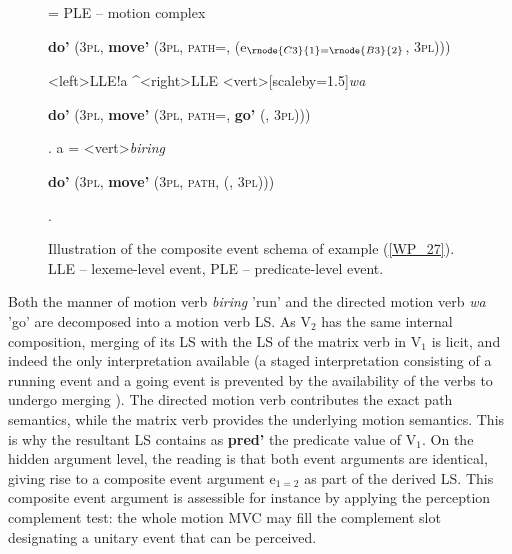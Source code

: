 \begin{figure}


\jtree[xunit=9.5em,yunit=2em]
\! = {PLE -- motion complex}{\begin{scriptsize}\textbf{do'} (3\textsc{pl}, \textbf{move'} (3\textsc{pl}, \textsc{path=}, \textbf{} (e$_{\rnode{C3}{1}=\rnode{B3}{2}}$, 3\textsc{pl})))\end{scriptsize}}
<left>{LLE}!a ^<right>{LLE}
<vert>[scaleby=1.5]{\textit{wa}}{\begin{scriptsize} \textbf{do'} (3\textsc{pl}, \textbf{move'} (3\textsc{pl}, \textsc{path=}, \textbf{go'} (, 3\textsc{pl})))\end{scriptsize}}.
\!a = <vert>{\textit{biring}}
{\begin{scriptsize} \textbf{do'} (3\textsc{pl}, \textbf{move'} (3\textsc{pl}, \textsc{path}, \textbf{} (, 3\textsc{pl})))\end{scriptsize}}.
\endjtree


\caption[Event schema illustration of example (\ref{WP_27})]{Illustration of the composite event schema of example (\ref{WP_27}). LLE -- lexeme-level event, PLE -- predicate-level event.}
\label{figure:eventschema_WP}
\end{figure}


Both the manner of motion verb \textit{biring} 'run' and the directed motion verb \textit{wa} 'go' are decomposed into a motion verb LS. As V$_2$ has the same internal composition, merging of its LS with the LS of the matrix verb in V$_1$ is licit, and indeed the only interpretation available (a staged interpretation consisting of a running event and a going event is prevented by the availability of the verbs to undergo merging ). The directed motion verb contributes the exact path semantics, while the matrix verb provides the underlying motion semantics. This is why the resultant LS contains as \textbf{pred'} the predicate value of V$_1$. On the hidden argument level, the reading is that both event arguments are identical, giving rise to a composite event argument e$_{1=2}$ as part of the derived LS. This composite event argument is assessible for instance by applying the perception complement test: the whole motion MVC may fill the complement slot designating a unitary event that can be perceived.

